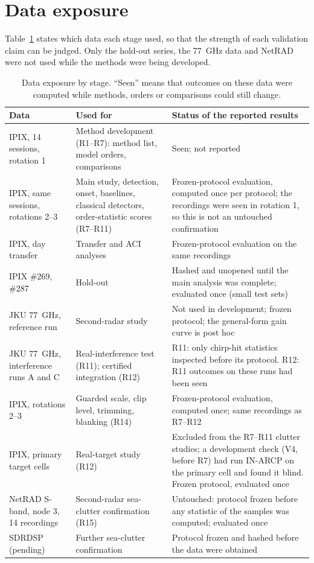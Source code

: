 \documentclass[10pt]{article}
\begin{document}
\section{Data exposure}
Table~\ref{tab:exposure} states which data each stage used, so that the strength of each validation claim can be judged. Only the hold-out series, the 77~GHz data and NetRAD were not used while the methods were being developed.
\begin{table}[h]
\centering\small
\caption{Data exposure by stage. ``Seen'' means that outcomes on these data were computed while methods, orders or comparisons could still change.}
\label{tab:exposure}
\begin{tabular}{p{4.3cm}p{5.2cm}p{6.2cm}}
\toprule
Data & Used for & Status of the reported results\\
\midrule
IPIX, 14 sessions, rotation 1 & Method development (R1--R7): method list, model orders, comparisons & Seen; not reported\\
IPIX, same sessions, rotations 2--3 & Main study, detection, onset, baselines, classical detectors, order-statistic scores (R7--R11) & Frozen-protocol evaluation, computed once per protocol; the recordings were seen in rotation 1, so this is not an untouched confirmation\\
IPIX, day transfer & Transfer and ACI analyses & Frozen-protocol evaluation on the same recordings\\
IPIX \#269, \#287 & Hold-out & Hashed and unopened until the main analysis was complete; evaluated once (small test sets)\\
JKU 77~GHz, reference run & Second-radar study & Not used in development; frozen protocol; the general-form gain curve is post hoc\\
JKU 77~GHz, interference runs A and C & Real-interference test (R11); certified integration (R12) & R11: only chirp-hit statistics inspected before its protocol. R12: R11 outcomes on these runs had been seen\\
IPIX, rotations 2--3 & Guarded scale, clip level, trimming, blanking (R14) & Frozen-protocol evaluation, computed once; same recordings as R7--R12\\
IPIX, primary target cells & Real-target study (R12) & Excluded from the R7--R11 clutter studies; a development check (V4, before R7) had run IN-ARCP on the primary cell and found it blind. Frozen protocol, evaluated once\\
NetRAD S-band, node 3, 14 recordings & Second-radar sea-clutter confirmation (R15) & Untouched: protocol frozen before any statistic of the samples was computed; evaluated once\\
SDRDSP (pending) & Further sea-clutter confirmation & Protocol frozen and hashed before the data were obtained\\
\bottomrule
\end{tabular}
\end{table}
\end{document}
